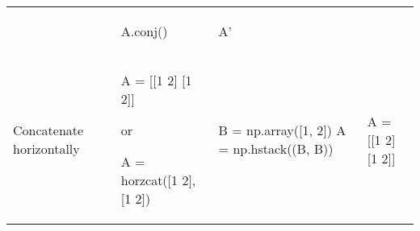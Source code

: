 \documentclass[10pt, landscape]{article}
\newenvironment{Shaded}{}{}
\newcommand{\DecValTok}[1]{\textcolor[rgb]{0.25,0.63,0.44}{{#1}}}
\newcommand{\FloatTok}[1]{\textcolor[rgb]{0.25,0.63,0.44}{{#1}}}
\newcommand{\OperatorTok}[1]{\textcolor[rgb]{0.40,0.40,0.40}{{#1}}}
\newcommand{\NormalTok}[1]{{#1}}
\begin{document}
\begin{multicols*}{2}
\begin{tabular}[ ]{@{}llll@{}}
\begin{minipage}[t]{0.23\columnwidth}
\begin{Shaded}
\end{Shaded}
\strut
\end{minipage} & \begin{minipage}[t]{0.20\columnwidth}\raggedright\strut
\begin{Shaded}
\begin{Highlighting}[]
\NormalTok{A.conj()}
\end{Highlighting}
\end{Shaded}
\strut
\end{minipage} & \begin{minipage}[t]{0.20\columnwidth}\raggedright\strut
\begin{Shaded}
\begin{Highlighting}[]
\NormalTok{A'}
\end{Highlighting}
\end{Shaded}
\strut
\end{minipage}\tabularnewline
\begin{minipage}[t]{0.24\columnwidth}\raggedright\strut
Concatenate horizontally\strut
\end{minipage} & \begin{minipage}[t]{0.23\columnwidth}\raggedright\strut
\begin{Shaded}
\begin{Highlighting}[]
\NormalTok{A = [[}\FloatTok{1} \FloatTok{2}\NormalTok{] [}\FloatTok{1} \FloatTok{2}\NormalTok{]]}
\end{Highlighting}
\end{Shaded}

or

\begin{Shaded}
\begin{Highlighting}[]
\NormalTok{A = horzcat([}\FloatTok{1} \FloatTok{2}\NormalTok{], [}\FloatTok{1} \FloatTok{2}\NormalTok{])}
\end{Highlighting}
\end{Shaded}
\strut
\end{minipage} & \begin{minipage}[t]{0.20\columnwidth}\raggedright\strut
\begin{Shaded}
\begin{Highlighting}[]
\NormalTok{B }\OperatorTok{=} \NormalTok{np.array([}\DecValTok{1}\NormalTok{, }\DecValTok{2}\NormalTok{])}
\NormalTok{A }\OperatorTok{=} \NormalTok{np.hstack((B, B))}
\end{Highlighting}
\end{Shaded}
\strut
\end{minipage} & \begin{minipage}[t]{0.20\columnwidth}\raggedright\strut
\begin{Shaded}
\begin{Highlighting}[]
\NormalTok{A = [[}\FloatTok{1} \FloatTok{2}\NormalTok{] [}\FloatTok{1} \FloatTok{2}\NormalTok{]]}
\end{Highlighting}
\end{Shaded}


\end{minipage}
\end{tabular}
\end{multicols*}
\end{document}
